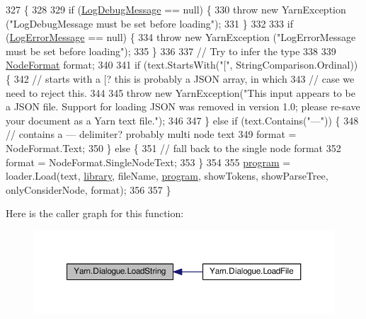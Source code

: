 \begin{DoxyCode}
327                                                                                                            
                                                 \{
328 
329             \textcolor{keywordflow}{if} (\hyperlink{a00090_a381f48bb0fbb294f8cf44ca57f11be31}{LogDebugMessage} == null) \{
330                 \textcolor{keywordflow}{throw} \textcolor{keyword}{new} YarnException (\textcolor{stringliteral}{"LogDebugMessage must be set before loading"});
331             \}
332 
333             \textcolor{keywordflow}{if} (\hyperlink{a00090_a9801e83dd044d6498fdf6ebcc6bec5ac}{LogErrorMessage} == null) \{
334                 \textcolor{keywordflow}{throw} \textcolor{keyword}{new} YarnException (\textcolor{stringliteral}{"LogErrorMessage must be set before loading"});
335             \}
336 
337             \textcolor{comment}{// Try to infer the type}
338 
339             \hyperlink{a00050_ad7ebb46e7309ead8767383a672b3272f}{NodeFormat} format;
340 
341             \textcolor{keywordflow}{if} (text.StartsWith(\textcolor{stringliteral}{"["}, StringComparison.Ordinal)) \{
342                 \textcolor{comment}{// starts with a [? this is probably a JSON array, in which}
343                 \textcolor{comment}{// case we need to reject this.}
344 
345                 \textcolor{keywordflow}{throw} \textcolor{keyword}{new} YarnException(\textcolor{stringliteral}{"This input appears to be a JSON file. Support for loading JSON was
       removed in version 1.0; please re-save your document as a Yarn text file."});
346                 
347             \} \textcolor{keywordflow}{else} \textcolor{keywordflow}{if} (text.Contains(\textcolor{stringliteral}{"---"})) \{
348                 \textcolor{comment}{// contains a --- delimiter? probably multi node text}
349                 format = NodeFormat.Text;
350             \} \textcolor{keywordflow}{else} \{
351                 \textcolor{comment}{// fall back to the single node format}
352                 format = NodeFormat.SingleNodeText;
353             \}
354 
355             \hyperlink{a00090_a0a1cca92325f430425d784d416cb5c2b}{program} = loader.Load(text, \hyperlink{a00090_ae660d4cfb6e296358d2f61d8ee74c66a}{library}, fileName, \hyperlink{a00090_a0a1cca92325f430425d784d416cb5c2b}{program}, showTokens, 
      showParseTree, onlyConsiderNode, format);
356 
357         \}
\end{DoxyCode}


Here is the caller graph for this function\-:
\nopagebreak
\begin{figure}[H]
\begin{center}
\leavevmode
\includegraphics[width=350pt]{a00090_a7b66187877ec8a2bfee2298d3dd16706_icgraph}
\end{center}
\end{figure}


